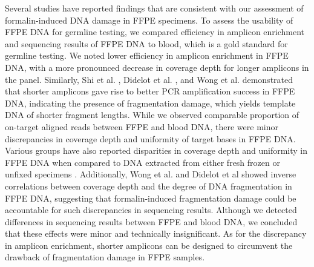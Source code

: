 Several studies have reported findings that are consistent with our assessment of formalin-induced DNA damage in FFPE specimens. To assess the usability of FFPE DNA for germline testing, we compared efficiency in amplicon enrichment and sequencing results of FFPE DNA to blood, which is a gold standard for germline testing. We noted lower efficiency in amplicon enrichment in FFPE DNA, with a more pronounced decrease in coverage depth for longer amplicons in the panel. Similarly, Shi et al. \cite{Shi2002}, Didelot et al. \cite{Didelot2013}, and Wong et al. \cite{Wong2013} demonstrated that shorter amplicons gave rise to better PCR amplification success in FFPE DNA, indicating the presence of fragmentation damage, which yields template DNA of shorter fragment lengths. While we observed comparable proportion of on-target aligned reads between FFPE and blood DNA, there were minor discrepancies in coverage depth and uniformity of target bases in FFPE DNA. Various groups have also reported disparities in coverage depth and uniformity in FFPE DNA when compared to DNA extracted from either fresh frozen or unfixed specimens \cite{Wong2013, Betge2015, Spencer2013}. Additionally, Wong et al. \cite{Wong2014} and Didelot et al \cite{Didelot2013} showed inverse correlations between coverage depth and the degree of DNA fragmentation in FFPE DNA, suggesting that formalin-induced fragmentation damage could be accountable for such discrepancies in sequencing results. Although we detected differences in sequencing results between FFPE and blood DNA, we concluded that these effects were minor and technically insignificant. As for the discrepancy in amplicon enrichment, shorter amplicons can be designed to circumvent the drawback of fragmentation damage in FFPE samples.

